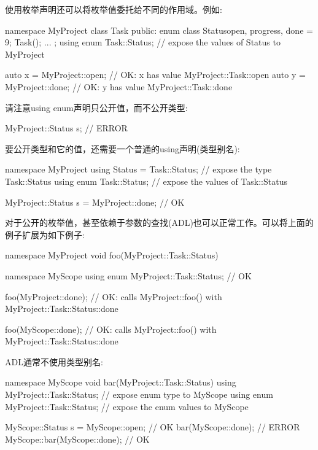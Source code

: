 使用枚举声明还可以将枚举值委托给不同的作用域。例如:

\begin{cpp}
namespace MyProject {
	class Task {
		public:
		enum class Status{open, progress, done = 9};
		Task();
		...
	};
	using enum Task::Status; // expose the values of Status to MyProject
}

auto x = MyProject::open; // OK: x has value MyProject::Task::open
auto y = MyProject::done; // OK: y has value MyProject::Task::done
\end{cpp}

请注意using enum声明只公开值，而不公开类型:

\begin{cpp}
MyProject::Status s; // ERROR
\end{cpp}

要公开类型和它的值，还需要一个普通的using声明(类型别名):

\begin{cpp}
namespace MyProject {
	using Status = Task::Status; // expose the type Task::Status
	using enum Task::Status; // expose the values of Task::Status
}

MyProject::Status s = MyProject::done; // OK
\end{cpp}

对于公开的枚举值，甚至依赖于参数的查找(ADL)也可以正常工作。可以将上面的例子扩展为如下例子:

\begin{cpp}
namespace MyProject {
	void foo(MyProject::Task::Status) {
	}
}

namespace MyScope {
	using enum MyProject::Task::Status; // OK
}

foo(MyProject::done); // OK: calls MyProject::foo() with MyProject::Task::Status::done

foo(MyScope::done); // OK: calls MyProject::foo() with MyProject::Task::Status::done
\end{cpp}

ADL通常不使用类型别名:

\begin{cpp}
namespace MyScope {
	void bar(MyProject::Task::Status) {
	}
	using MyProject::Task::Status; // expose enum type to MyScope
	using enum MyProject::Task::Status; // expose the enum values to MyScope
}

MyScope::Status s = MyScope::open; // OK
bar(MyScope::done); // ERROR
MyScope::bar(MyScope::done); // OK
\end{cpp}




